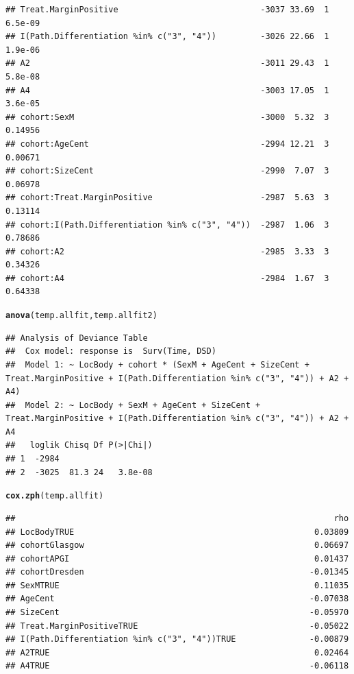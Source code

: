 \documentclass{article}\usepackage[]{graphicx}\usepackage[]{color}
\makeatletter
\newcommand{\hlstd}[1]{\textcolor[rgb]{0.345,0.345,0.345}{#1}}%
\newcommand{\hlkwd}[1]{\textcolor[rgb]{0.737,0.353,0.396}{\textbf{#1}}}%
\newenvironment{kframe}{%
 \def\at@end@of@kframe{}%
 \ifinner\ifhmode%
  \def\at@end@of@kframe{\end{minipage}}%
  \begin{minipage}{\columnwidth}%
 \fi\fi%
 \def\FrameCommand##1{\hskip\@totalleftmargin \hskip-\fboxsep
 \colorbox{shadecolor}{##1}\hskip-\fboxsep
     \hskip-\linewidth \hskip-\@totalleftmargin \hskip\columnwidth}%
 \MakeFramed {\advance\hsize-\width
   \@totalleftmargin\z@ \linewidth\hsize
   \@setminipage}}%
 {\par\unskip\endMakeFramed%
 \at@end@of@kframe}
\newenvironment{knitrout}{}{} %
\makeatother
\begin{document}
\begin{knitrout}
\begin{kframe}
\begin{verbatim}
## Treat.MarginPositive                             -3037 33.69  1    6.5e-09
## I(Path.Differentiation %in% c("3", "4"))         -3026 22.66  1    1.9e-06
## A2                                               -3011 29.43  1    5.8e-08
## A4                                               -3003 17.05  1    3.6e-05
## cohort:SexM                                      -3000  5.32  3    0.14956
## cohort:AgeCent                                   -2994 12.21  3    0.00671
## cohort:SizeCent                                  -2990  7.07  3    0.06978
## cohort:Treat.MarginPositive                      -2987  5.63  3    0.13114
## cohort:I(Path.Differentiation %in% c("3", "4"))  -2987  1.06  3    0.78686
## cohort:A2                                        -2985  3.33  3    0.34326
## cohort:A4                                        -2984  1.67  3    0.64338
\end{verbatim}
\begin{alltt}
\hlkwd{anova}\hlstd{(temp.allfit, temp.allfit2)}
\end{alltt}
\begin{verbatim}
## Analysis of Deviance Table
##  Cox model: response is  Surv(Time, DSD)
##  Model 1: ~ LocBody + cohort * (SexM + AgeCent + SizeCent + Treat.MarginPositive + I(Path.Differentiation %in% c("3", "4")) + A2 + A4)
##  Model 2: ~ LocBody + SexM + AgeCent + SizeCent + Treat.MarginPositive + I(Path.Differentiation %in% c("3", "4")) + A2 + A4
##   loglik Chisq Df P(>|Chi|)
## 1  -2984                   
## 2  -3025  81.3 24   3.8e-08
\end{verbatim}
\begin{alltt}
\hlkwd{cox.zph}\hlstd{(temp.allfit)}
\end{alltt}
\begin{verbatim}
##                                                                 rho
## LocBodyTRUE                                                 0.03809
## cohortGlasgow                                               0.06697
## cohortAPGI                                                  0.01437
## cohortDresden                                              -0.01345
## SexMTRUE                                                    0.11035
## AgeCent                                                    -0.07038
## SizeCent                                                   -0.05970
## Treat.MarginPositiveTRUE                                   -0.05022
## I(Path.Differentiation %in% c("3", "4"))TRUE               -0.00879
## A2TRUE                                                      0.02464
## A4TRUE                                                     -0.06118

\end{verbatim}
\end{kframe}
\end{knitrout}
\end{document}
